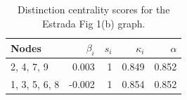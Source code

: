 \begin{table}
\centering
\caption{\label{tab:estrada1b}Distinction centrality scores for the Estrada Fig 1(b) graph.}
\centering
\begin{tabular}[t]{lrrrr}
\toprule
Nodes & $\beta_i$ & $s_i$ & $\kappa_i$ & $\alpha$\\
\midrule
2, 4, 7, 9 & 0.003 & 1 & 0.849 & 0.852\\
1, 3, 5, 6, 8 & -0.002 & 1 & 0.854 & 0.852\\
\bottomrule
\end{tabular}
\end{table}
